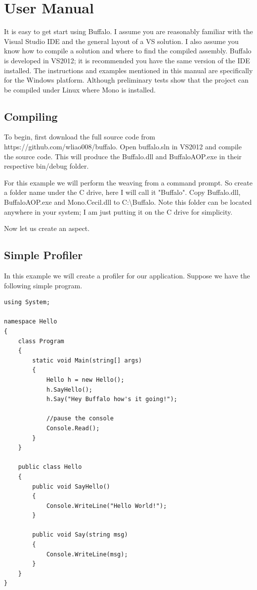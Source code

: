 \chapter{User Manual}

It is easy to get start using Buffalo. I assume you are reasonably familiar with the Visual Studio IDE and the general layout of a VS solution. I also assume you know how to compile a solution and where to find the compiled assembly. Buffalo is developed in VS2012; it is recommended you have the same version of the IDE installed. The instructions and examples mentioned in this manual are specifically for the Windows platform. Although preliminary tests show that the project can be compiled under Linux where Mono is installed. 

\section{Compiling}
To begin, first download the full source code from https://github.com/wliao008/buffalo. Open buffalo.sln in VS2012 and compile the source code. This will produce the Buffalo.dll and BuffaloAOP.exe in their respective bin/debug folder.

For this example we will perform the weaving from a command prompt. So create a folder name under the C drive, here I will call it "Buffalo". Copy Buffalo.dll, BuffaloAOP.exe and Mono.Cecil.dll to C:\textbackslash{Buffalo}. Note this folder can be located anywhere in your system; I am just putting it on the C drive for simplicity.

Now let us create an aspect.

\section{Simple Profiler}
In this example we will create a profiler for our application. Suppose we have the following simple program.

\begin{lstlisting}[caption={Hello program}, label=helloprogram, frame=tb, basicstyle=\scriptsize]
using System;

namespace Hello
{
    class Program
    {
        static void Main(string[] args)
        {
            Hello h = new Hello();
            h.SayHello();
            h.Say("Hey Buffalo how's it going!");

            //pause the console
            Console.Read();
        }
    }

    public class Hello
    {
        public void SayHello()
        {
            Console.WriteLine("Hello World!");
        }

        public void Say(string msg)
        {
            Console.WriteLine(msg);
        }
    }
}
\end{lstlisting}

